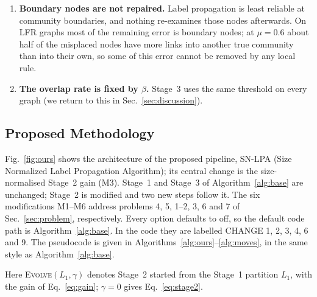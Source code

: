 \documentclass[conference]{IEEEtran}
\begin{document}
\begin{enumerate}
\item \textbf{Boundary nodes are not repaired.} Label propagation is least reliable at community boundaries, and nothing re-examines those nodes afterwards. On LFR graphs most of the remaining error is boundary nodes; at $\mu=0.6$ about half of the misplaced nodes have more links into another true community than into their own, so some of this error cannot be removed by any local rule.
\item \textbf{The overlap rate is fixed by $\beta$.} Stage~3 uses the same threshold on every graph (we return to this in Sec.~\ref{sec:discussion}).
\end{enumerate}

\subsection{Proposed Methodology}\label{sec:arch}
Fig.~\ref{fig:ours} shows the architecture of the proposed pipeline, SN-LPA (Size Normalized Label Propagation Algorithm); its central change is the size-normalised Stage~2 gain (M3). Stage~1 and Stage~3 of Algorithm~\ref{alg:base} are unchanged; Stage~2 is modified and two new steps follow it. The six modifications M1--M6 address problems 4, 5, 1--2, 3, 6 and 7 of Sec.~\ref{sec:problem}, respectively. Every option defaults to off, so the default code path is Algorithm~\ref{alg:base}. In the code they are labelled CHANGE 1, 2, 3, 4, 6 and 9. The pseudocode is given in Algorithms~\ref{alg:ours}--\ref{alg:moves}, in the same style as Algorithm~\ref{alg:base}.

\noindent Here \textsc{Evolve}$(L_1,\gamma)$ denotes Stage~2 started from the Stage~1 partition $L_1$, with the gain of Eq.~\eqref{eq:gain}; $\gamma=0$ gives Eq.~\eqref{eq:stage2}.
\end{document}
